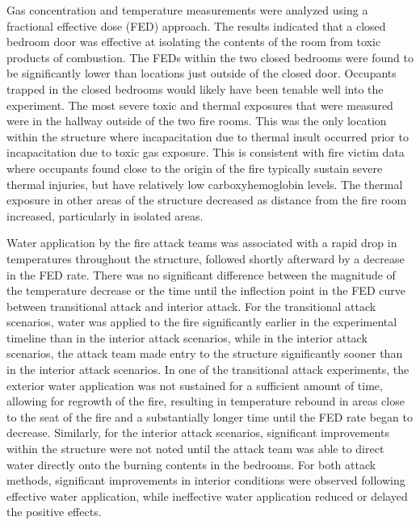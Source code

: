 \documentclass[12pt,oneside]{article}
\begin{document}
Gas concentration and temperature measurements were analyzed using a fractional effective dose (FED) approach. The results indicated that a closed bedroom door was effective at isolating the contents of the room from toxic products of combustion. The FEDs within the two closed bedrooms were found to be significantly lower than locations just outside of the closed door. Occupants trapped in the closed bedrooms would likely have been tenable well into the experiment. The most severe toxic and thermal exposures that were measured were in the hallway outside of the two fire rooms. This was the only location within the structure where incapacitation due to thermal insult occurred prior to incapacitation due to toxic gas exposure. This is consistent with fire victim data where occupants found close to the  origin of the fire typically sustain severe thermal injuries, but have relatively low carboxyhemoglobin levels. The thermal exposure in other areas of the structure decreased as distance from the fire room increased, particularly in isolated areas. 

Water application by the fire attack teams was associated with a rapid drop in temperatures throughout the structure, followed shortly afterward by a decrease in the FED rate. There was no significant difference between the magnitude of the temperature decrease or the time until the inflection point in the FED curve between transitional attack and interior attack. For the transitional attack scenarios, water was applied to the fire significantly earlier in the experimental timeline than in the interior attack scenarios, while in the interior attack scenarios, the attack team made entry to the structure significantly sooner than in the interior attack scenarios. In one of the transitional attack experiments, the exterior water application was not sustained for a sufficient amount of time, allowing for regrowth of the fire, resulting in temperature rebound in areas close to the seat of the fire and a substantially longer time until the FED rate began to decrease. Similarly, for the interior attack scenarios, significant improvements within the structure were not noted until the attack team was able to direct water directly onto the burning contents in the bedrooms. For both attack methods, significant improvements in  interior conditions were observed following effective water application, while ineffective water application reduced or delayed the positive effects. 
\end{document}
